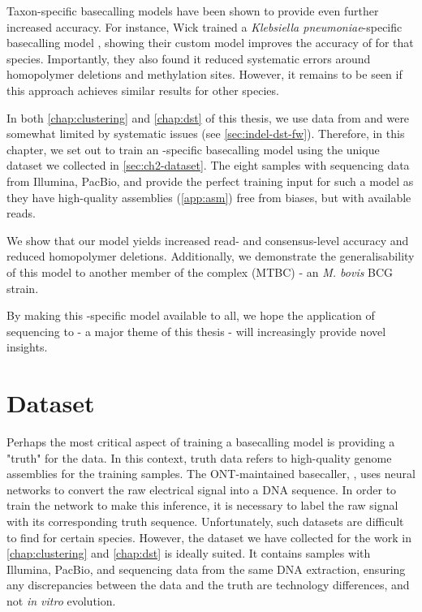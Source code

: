 Taxon-specific \ont{} basecalling models have been shown to provide even further increased accuracy. For instance, Wick \etal{} trained a \textit{Klebsiella pneumoniae}-specific basecalling model \cite{wick2019}, showing their custom model improves the accuracy of \ont{} for that species. Importantly, they also found it reduced systematic errors around homopolymer deletions and methylation sites. However, it remains to be seen if this approach achieves similar results for other species.

In both \autoref{chap:clustering} and \autoref{chap:dst} of this thesis, we use \ont{} data from \mtb{} and were somewhat limited by systematic issues (see \autoref{sec:indel-dst-fw}). Therefore, in this chapter, we set out to train an \mtb{}-specific \ont{} basecalling model using the unique dataset we collected in \autoref{sec:ch2-dataset}. The eight samples with sequencing data from Illumina, PacBio, and \ont{} provide the perfect training input for such a model as they have high-quality assemblies (\autoref{app:asm}) free from \ont{} biases, but with available \ont{} reads.

We show that our \mtb{} \ont{} model yields increased read- and consensus-level accuracy and reduced homopolymer deletions. Additionally, we demonstrate the generalisability of this model to another member of the \mtb{} complex (MTBC) - an \textit{M. bovis} BCG strain.

By making this \mtb{}-specific model available to all, we hope the application of \ont{} sequencing to \mtb{} - a major theme of this thesis - will increasingly provide novel insights.

\section{Dataset}
\label{sec:tubby-data}

Perhaps the most critical aspect of training a basecalling model is providing a "truth" for the data. In this context, truth data refers to high-quality genome assemblies for the training samples. The ONT-maintained basecaller, \guppy{}, uses neural networks to convert the raw electrical signal into a DNA sequence. In order to train the network to make this inference, it is necessary to label the raw signal with its corresponding truth sequence. Unfortunately, such datasets are difficult to find for certain species. However, the dataset we have collected for the work in \autoref{chap:clustering} and \autoref{chap:dst} is ideally suited. It contains samples with Illumina, PacBio, and \ont{} sequencing data from the same DNA extraction, ensuring any discrepancies between the \ont{} data and the truth are technology differences, and not \textit{in vitro} evolution. 

